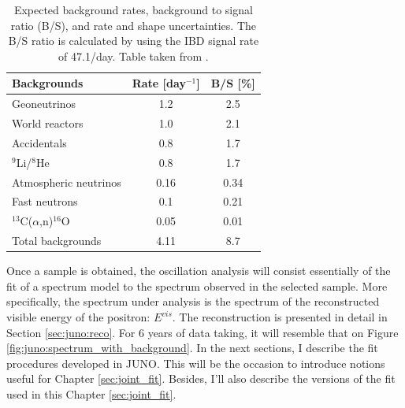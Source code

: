 \documentclass[../main.tex]{subfiles}
\begin{document}
\begin{table}[ht]
  \centering
  \begin{tabular}{l|c|c}
    \hline
    Backgrounds           & Rate [day$^{-1}$] & B/S [\%] \\
    \hline
    Geoneutrinos          & 1.2               & 2.5 \\
    World reactors        & 1.0               & 2.1 \\
    Accidentals           & 0.8               & 1.7 \\
    $^9$Li/$^8$He         & 0.8               & 1.7 \\
    Atmospheric neutrinos & 0.16              & 0.34 \\
    Fast neutrons         & 0.1               & 0.21 \\
    $^{13}$C($\alpha$,n)$^{16}$O & 0.05       & 0.01 \\
    \hline
    Total backgrounds     & 4.11              & 8.7 \\
    \hline
  \end{tabular}
  \caption{Expected background rates, background to signal ratio (B/S), and rate and shape uncertainties. The B/S ratio is calculated by using the IBD signal rate of 47.1/day. Table taken from \cite{abusleme_potential_2024}.}
  \label{tab:juno:res_bg}
\end{table}

Once a sample is obtained, the oscillation analysis will consist essentially of the fit of a spectrum model to the spectrum observed in the selected sample. More specifically, the spectrum under analysis is the spectrum of the reconstructed visible energy of the positron: $E^{vis}$.
The reconstruction is presented in detail in Section \ref{sec:juno:reco}. For 6 years of data taking, it will resemble that on Figure \ref{fig:juno:spectrum_with_background}. In the next sections, I describe the fit procedures developed in JUNO. This will be the occasion to introduce notions useful for Chapter \ref{sec:joint_fit}. Besides, I'll also describe the versions of the fit used in this Chapter \ref{sec:joint_fit}.

%
%
%
\end{document}
